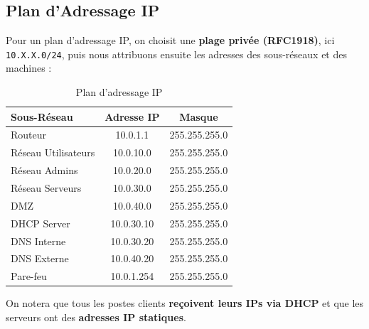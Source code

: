 \documentclass[../Livrable1.tex]{subfiles}
\begin{document}
\subsection{Plan d'Adressage IP}

Pour un plan d'adressage IP, on choisit une \textbf{plage privée (RFC1918)}, ici \texttt{10.X.X.0/24}, puis nous attribuons ensuite les adresses des sous-réseaux et des machines :

\begin{table}[h]
    \centering
    \begin{tabular}{|l|c|c|}
        \hline
        \textbf{Sous-Réseau} & \textbf{Adresse IP} & \textbf{Masque} \\
        \hline
        Routeur & 10.0.1.1 & 255.255.255.0 \\
        Réseau Utilisateurs & 10.0.10.0 & 255.255.255.0 \\
        Réseau Admins & 10.0.20.0 & 255.255.255.0 \\
        Réseau Serveurs & 10.0.30.0 & 255.255.255.0 \\
        DMZ & 10.0.40.0 & 255.255.255.0 \\
        DHCP Server & 10.0.30.10 & 255.255.255.0 \\
        DNS Interne & 10.0.30.20 & 255.255.255.0 \\
        DNS Externe & 10.0.40.20 & 255.255.255.0 \\
        Pare-feu & 10.0.1.254 & 255.255.255.0 \\
        \hline
    \end{tabular}
    \caption{Plan d’adressage IP}
\end{table}

On notera que tous les postes clients \textbf{reçoivent leurs IPs via DHCP} et que les serveurs ont des \textbf{adresses IP statiques}.
\end{document}
